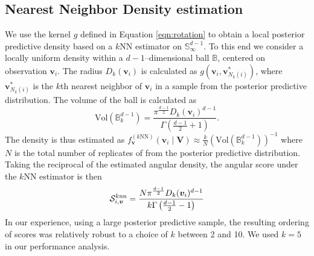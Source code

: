 \subsection{Nearest Neighbor Density estimation}
We use the kernel $g$ defined in Equation \ref{eqn:rotation} to obtain 
    a local posterior predictive density based on a $k$NN estimator 
    on $\mathbb{S}_{\infty}^{d-1}$. To this end we consider a locally 
    uniform density within a $d-1$--dimensional ball $\mathbb{B}$, centered on 
    observation $\bm{v}_i$.  The radius $D_{k}(\bm{v}_i)$ is calculated as 
    $g\left(\bm{v}_i, \bm{v}_{N_k(i)}^*\right)$, where $\bm{v}_{N_k(i)}^*$ is the $k$th nearest 
    neighbor of $\bm{v}_i$ in a sample from the 
    posterior predictive distribution. The volume of the ball is calculated as
    \begin{equation}
        \label{eqn:vol_sphere}
        \text{Vol}(\mathbb{B}_k^{d-1}) =
        \frac{\pi^{\frac{d-1}{2}}D_{k}(\bm{v}_i)^{d-1}}{
            \Gamma\left(\frac{d-1}{2} + 1\right)}.
    \end{equation}
    The density is thus estimated as 
    $f_{\bm{v}}^{(k\text{NN})}(\bm{v}_i\mid \bm{V}) \approx 
        \frac{k}{N}\left(\text{Vol}(\mathbb{B}_{k}^{d-1})\right)^{-1}$
    where $N$ is the total number of replicates of from the posterior predictive
    distribution.  Taking the reciprocal of the estimated angular density, 
    the angular score under the $k$NN estimator is then
    \begin{equation}
        \label{eqn:ad_knn_h}
        \mathcal{S}_{i,\bm{v}}^{\text{$k$nn}} = 
            \frac{N\pi^{\frac{d-1}{2}}D_{k}(\bm{v}_i)^{d-1}}{
            k\Gamma\left(\frac{d-1}{2} - 1\right)}
    \end{equation}
    In our experience, using a large posterior predictive sample,
    the resulting ordering of scores was relatively robust to a choice of $k$ 
    between 2 and 10.  We used $k = 5$ in our performance analysis.

